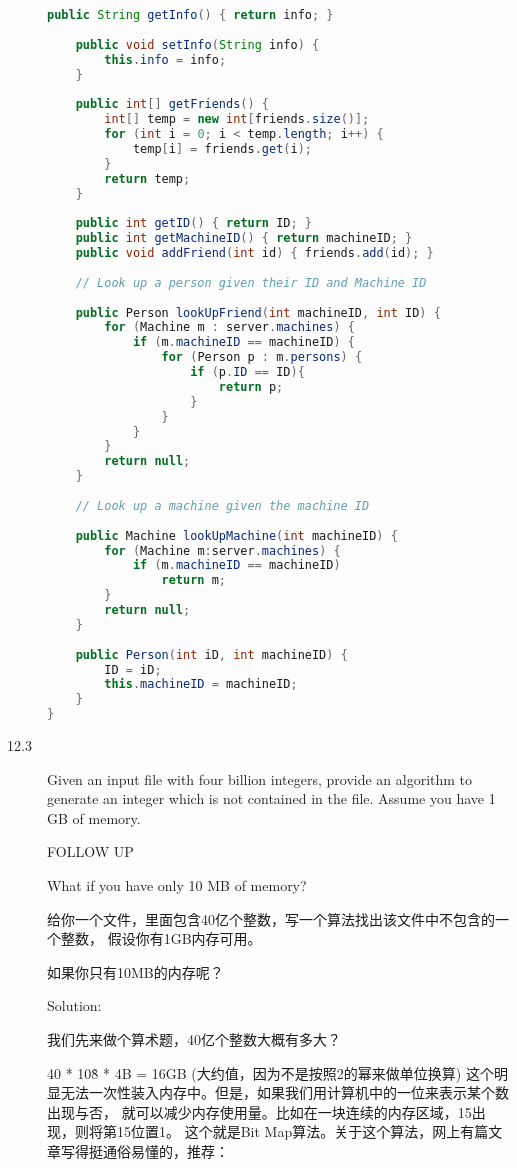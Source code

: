 \begin{description}
\begin{lstlisting}[language=Java]
    public String getInfo() { return info; }
    
    public void setInfo(String info) {
        this.info = info;
    }
    
    public int[] getFriends() {
        int[] temp = new int[friends.size()];
        for (int i = 0; i < temp.length; i++) {
            temp[i] = friends.get(i);
        }
        return temp;
    }
    
    public int getID() { return ID; }
    public int getMachineID() { return machineID; }
    public void addFriend(int id) { friends.add(id); }
    
    // Look up a person given their ID and Machine ID
    
    public Person lookUpFriend(int machineID, int ID) {
        for (Machine m : server.machines) {
            if (m.machineID == machineID) {
                for (Person p : m.persons) {
                    if (p.ID == ID){
                        return p;                      
                    }
                }
            }
        }
        return null;
    }
    
    // Look up a machine given the machine ID
    
    public Machine lookUpMachine(int machineID) {
        for (Machine m:server.machines) {
            if (m.machineID == machineID)
                return m;
        }
        return null;
    }
    
    public Person(int iD, int machineID) {
        ID = iD;
        this.machineID = machineID;
    }
}
\end{lstlisting}


\item[12.3] Given an input file with four billion integers, provide an algorithm to generate an integer which is not contained in the file. Assume you have 1 GB of memory.

FOLLOW UP

What if you have only 10 MB of memory?

给你一个文件，里面包含40亿个整数，写一个算法找出该文件中不包含的一个整数， 假设你有1GB内存可用。

如果你只有10MB的内存呢？

Solution: 

我们先来做个算术题，40亿个整数大概有多大？

40 * 10\^8 * 4B = 16GB (大约值，因为不是按照2的幂来做单位换算)
这个明显无法一次性装入内存中。但是，如果我们用计算机中的一位来表示某个数出现与否， 就可以减少内存使用量。比如在一块连续的内存区域，15出现，则将第15位置1。 这个就是Bit Map算法。关于这个算法，网上有篇文章写得挺通俗易懂的，推荐：


\end{description}
